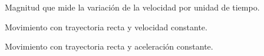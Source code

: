 \begin{vocabulary}
    Magnitud que mide la variación de la velocidad por unidad de tiempo.
\end{vocabulary}

\begin{vocabulary}
    Movimiento con trayectoria recta y velocidad constante.
\end{vocabulary}

\begin{vocabulary}
    Movimiento con trayectoria recta y aceleración constante.
\end{vocabulary}
